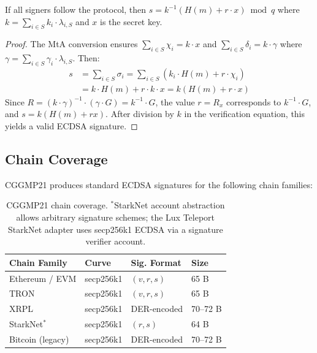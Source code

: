 \begin{theorem}
\label{thm:cggmp-correct}
If all signers follow the protocol, then $s = k^{-1}(H(m) + r \cdot x) \bmod q$
where $k = \sum_{i \in S} k_i \cdot \lambda_{i,S}$ and $x$ is the secret key.
\end{theorem}

\begin{proof}
The MtA conversion ensures $\sum_{i \in S} \chi_i = k \cdot x$ and
$\sum_{i \in S} \delta_i = k \cdot \gamma$ where $\gamma = \sum_{i \in S} \gamma_i
\cdot \lambda_{i,S}$. Then:
\begin{align*}
s &= \sum_{i \in S} \sigma_i = \sum_{i \in S} (k_i \cdot H(m) + r \cdot \chi_i) \\
  &= k \cdot H(m) + r \cdot k \cdot x = k(H(m) + r \cdot x)
\end{align*}
Since $R = (k \cdot \gamma)^{-1} \cdot (\gamma \cdot G) = k^{-1} \cdot G$, the
value $r = R_x$ corresponds to $k^{-1} \cdot G$, and $s = k(H(m) + rx)$. After
division by $k$ in the verification equation, this yields a valid ECDSA signature.
\end{proof}

\subsection{Chain Coverage}

CGGMP21 produces standard ECDSA signatures for the following chain families:

\begin{table}[H]
\centering
\small
\begin{tabular}{@{}llll@{}}
\toprule
\textbf{Chain Family} & \textbf{Curve} & \textbf{Sig. Format} & \textbf{Size} \\
\midrule
Ethereum / EVM & secp256k1 & $(v, r, s)$ & 65 B \\
TRON & secp256k1 & $(v, r, s)$ & 65 B \\
XRPL & secp256k1 & DER-encoded & 70--72 B \\
StarkNet${}^*$ & secp256k1 & $(r, s)$ & 64 B \\
Bitcoin (legacy) & secp256k1 & DER-encoded & 70--72 B \\
\bottomrule
\end{tabular}
\caption{CGGMP21 chain coverage. ${}^*$StarkNet account abstraction allows arbitrary
signature schemes; the Lux Teleport StarkNet adapter uses secp256k1 ECDSA via a
signature verifier account.}
\label{tab:cggmp-chains}
\end{table}

